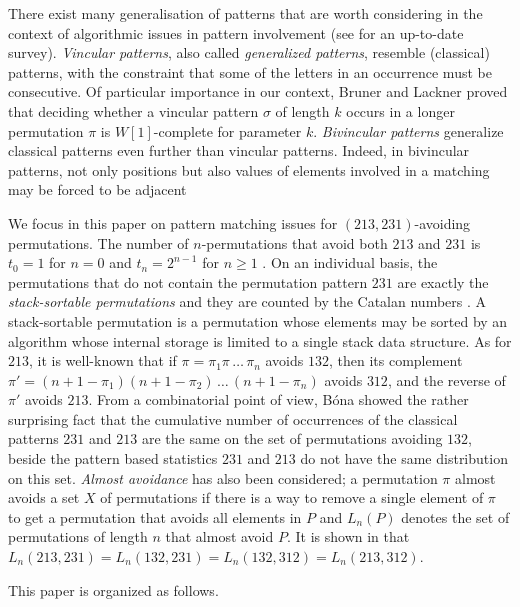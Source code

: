 \documentclass[a4paper]{llncs}
\newcounter{num}
\begin{document}
	There exist many generalisation of patterns that are worth considering
	in the context of algorithmic issues in pattern involvement
	(see \cite{Kitaev:book:2011} for an up-to-date survey).
	\emph{Vincular patterns}, also called
	\emph{generalized patterns},
	resemble (classical) patterns, with the constraint that some of the letters in
	an occurrence must be consecutive.
	Of particular importance in our context,
	Bruner and Lackner \cite{Bruner:Lackner:SWAT:2012}
	proved that deciding whether a vincular pattern
	$\sigma$ of length $k$ occurs in a longer permutation
	$\pi$ is $W[1]$-complete for
	parameter $k$.
	\emph{Bivincular patterns} generalize classical patterns even further
	than vincular
	patterns. Indeed, in bivincular patterns,
	not only positions but also values
	of elements involved in a matching may be forced to be adjacent

	We focus in this paper on pattern matching issues for
	$(213,231)$-avoiding permutations.
	The number of $n$-permutations that avoid both
	$213$ and $231$ is
	$t_0 = 1$ for $n = 0$ and
	$t_n =2^{n-1}$ for $n\geq 1$ \cite{Simion:Schmidt:EJC:1985}.
	On an individual basis,
	the permutations that do not contain the permutation pattern $231$
	are exactly the \emph{stack-sortable permutations} and they are counted by
	the Catalan numbers \cite{Knuth:1997:ACP:260999}.
	A stack-sortable permutation is a permutation whose elements may be sorted by
	an algorithm whose internal storage is limited to a single stack data structure.
	As for $213$, it is well-known that
 	if $\pi = \pi_1\pi\,\ldots\,\pi_n$ avoids $132$, then its complement
 	$\pi' = (n+1-\pi_1)(n+1-\pi_2)\,\ldots\,(n+1-\pi_n)$ avoids $312$, and
 	the reverse of $\pi'$ avoids $213$.
 	From a combinatorial point of view,
 	B\'ona \cite{Bona:ElJC:2012}
 	showed the rather surprising fact that the cumulative number of
 	occurrences of the classical patterns $231$ and $213$ are the same on the
 	set of permutations avoiding $132$,
 	beside the pattern based statistics $231$ and $213$
 	do not have the same distribution on this set.
 	\emph{Almost avoidance} has also been considered;
 	a permutation $\pi$ almost avoids a set $X$ of permutations
 	if there is a way to remove a single element of $\pi$ to get a permutation
 	that avoids all elements in $P$
 	and $L_n(P)$ denotes the set of permutations of length $n$ that almost avoid
 	$P$.
 	It is shown in \cite{Griffiths:Smith:Warren:PMA:2011} that
 	$L_n(213, 231) = L_n(132, 231) = L_n(132, 312) = L_n(213, 312)$.

	This paper is organized as follows.
\end{document}
